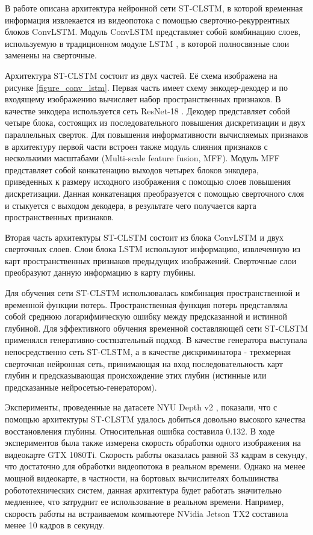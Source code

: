 \documentclass{mipt-thesis-ms}
\begin{document}
	В работе \cite{zhang2019exploiting} описана архитектура нейронной сети ST-CLSTM, в которой временная информация извлекается из видеопотока с помощью сверточно-рекуррентных блоков ConvLSTM. Модуль ConvLSTM представляет собой комбинацию слоев, используемую в традиционном модуле LSTM \cite{greff2016lstm}, в которой полносвязные слои заменены на сверточные.
	
	Архитектура ST-CLSTM состоит из двух частей. Её схема изображена на рисунке \ref{figure_conv_lstm}. Первая часть имеет схему энкодер-декодер и по входящему изображению вычисляет набор пространственных признаков. В качестве энкодера используется сеть ResNet-18 \cite{he2016deep}. Декодер представляет собой четыре блока, состоящих из последовательного повышения дискретизации и двух параллельных сверток. Для повышения информативности вычисляемых признаков в архитектуру первой части встроен также модуль слияния признаков с несколькими масштабами (Multi-scale feature fusion, MFF). Модуль MFF представляет собой конкатенацию выходов четырех блоков энкодера, приведенных к размеру исходного изображения с помощью слоев повышения дискретизации. Данная конкатенация преобразуется с помощью сверточного слоя и стыкуется с выходом декодера, в результате чего получается карта пространственных признаков.
	
	Вторая часть архитектуры ST-CLSTM состоит из блока ConvLSTM и двух сверточных слоев. Слои блока LSTM используют информацию, извлеченную из карт пространственных признаков предыдущих изображений. Сверточные слои преобразуют данную информацию в карту глубины.
	
	Для обучения сети ST-CLSTM использовалась комбинация пространственной и временной функции потерь. Пространственная функция потерь представляла собой среднюю логарифмическую ошибку между предсказанной и истинной глубиной. Для эффективного обучения временной составляющей сети ST-CLSTM применялся генеративно-состязательный подход. В качестве генератора выступала непосредственно сеть ST-CLSTM, а в качестве дискриминатора - трехмерная сверточная нейронная сеть, принимающая на вход последовательность карт глубин и предсказывающая происхождение этих глубин (истинные или предсказанные нейросетью-генератором).
	
	Эксперименты, проведенные на датасете NYU Depth v2 \cite{silberman2012indoor}, показали, что с помощью архитектуры ST-CLSTM удалось добиться довольно высокого качества восстановления глубины. Относительная ошибка составила 0.132. В ходе экспериментов была также измерена скорость обработки одного изображения на видеокарте GTX 1080Ti. Скорость работы оказалась равной 33 кадрам в секунду, что достаточно для обработки видеопотока в реальном времени. Однако на менее мощной видеокарте, в частности, на бортовых вычислителях большинства робототехнических систем, данная архитектура будет работать значительно медленнее, что затруднит ее использование в реальном времени. Например, скорость работы на встраиваемом компьютере NVidia Jetson TX2 составила менее 10 кадров в секунду.
	
\end{document}
